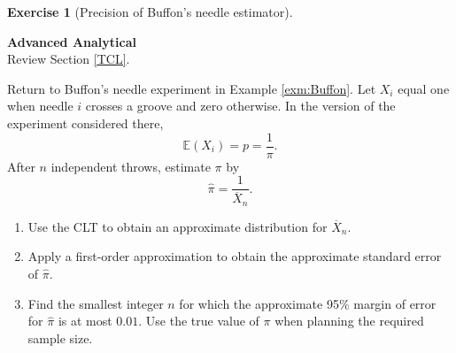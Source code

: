 \documentclass[
  11pt,
]{book}
\providecommand{\tightlist}{%
  \setlength{\itemsep}{0pt}\setlength{\parskip}{0pt}}
\theoremstyle{definition}
\theoremstyle{definition}
\theoremstyle{definition}
\newtheorem{exercise}{Exercise}[chapter]
\theoremstyle{definition}
\theoremstyle{remark}
\begin{document}
\begin{exercisebox}

\begin{exercise}[Precision of Buffon's needle estimator]
\protect\hypertarget{exr:clt-buffon-precision}{}\label{exr:clt-buffon-precision}

\textbf{Advanced \textbar{} Analytical}\\
Review Section \ref{TCL}.

Return to Buffon's needle experiment in Example \ref{exm:Buffon}. Let \(X_i\) equal one when needle \(i\) crosses a groove and zero otherwise. In the version of the experiment considered there,
\[
\mathbb{E}(X_i)=p=\frac{1}{\pi}.
\]
After \(n\) independent throws, estimate \(\pi\) by
\[
\widehat\pi=\frac{1}{\overline X_n}.
\]

\begin{enumerate}
\def\labelenumi{\arabic{enumi}.}
\tightlist
\item
  Use the CLT to obtain an approximate distribution for \(\overline X_n\).
\item
  Apply a first-order approximation to obtain the approximate standard error of \(\widehat\pi\).
\item
  Find the smallest integer \(n\) for which the approximate 95\% margin of error for \(\widehat\pi\) is at most \(0.01\). Use the true value of \(\pi\) when planning the required sample size.
\end{enumerate}

\end{exercise}

\end{exercisebox}

\end{document}
